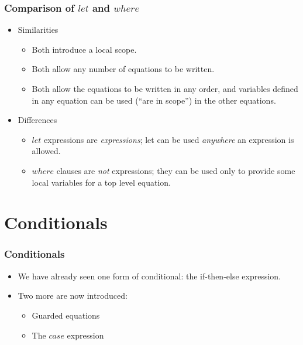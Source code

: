 \documentclass{beamer}
\begin{document}
\begin{frame}[fragile]
\frametitle{Comparison of $let$ and $where$}

\begin{itemize}
\item Similarities
  \begin{itemize}
  \item Both introduce a local scope.
  \item Both allow any number of equations to be written.
  \item Both allow the equations to be written in any order, and
    variables defined in any equation can be used (``are in scope'')
    in the other equations.
  \end{itemize}
\item Differences
  \begin{itemize}
  \item $let$ expressions are \emph{expressions}; let can be used
    \emph{anywhere} an expression is allowed.
  \item $where$ clauses are \emph{not} expressions; they can be
    used only to provide some local variables for a top level
    equation.
  \end{itemize}
\end{itemize}

\end{frame}

\section{Conditionals}
\begin{frame}[fragile]
\frametitle{Conditionals}

\begin{itemize}
\item We have already seen one form of conditional: the
  if-then-else expression.
\item Two more are now introduced:
  \begin{itemize}
  \item Guarded equations
  \item The $case$ expression
  \end{itemize}
\end{itemize}

\end{frame}

\end{document}
